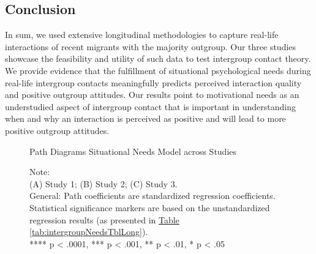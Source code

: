 \documentclass[man, 12pt, a4paper, mask]{apa7}
\theoremstyle{break}
\theoremstyle{plain}
\newcommand{\tblref}[2][]{\hyperref[#2]{Table \ref*{#2}#1}}
\begin{document}
\subsection{Conclusion}
In sum, we used extensive longitudinal methodologies to capture real-life interactions of recent migrants with the majority outgroup. Our three studies showcase the feasibility and utility of such data to test intergroup contact theory. We provide evidence that the fulfillment of situational psychological needs during real-life intergroup contacts meaningfully predicts perceived interaction quality and positive outgroup attitudes. Our results point to motivational needs as an understudied aspect of intergroup contact that is important in understanding when and why an interaction is perceived as positive and will lead to more positive outgroup attitudes.








\begin{figure}
  \caption{Path Diagrams Situational Needs Model across Studies}
  \label{fig:MainPaths}
  \begin{center}
    
  \end{center}
  \caption*{Note: \\
  (A) Study 1; (B) Study 2; (C) Study 3.\\
  General: Path coefficients are standardized regression coefficients. Statistical significance markers are based on the unstandardized regression results (as presented in \tblref{tab:intergroupNeedsTblLong}).\\
  **** p < .0001, *** p < .001, ** p < .01, * p < .05}
\end{figure}
\end{document}
